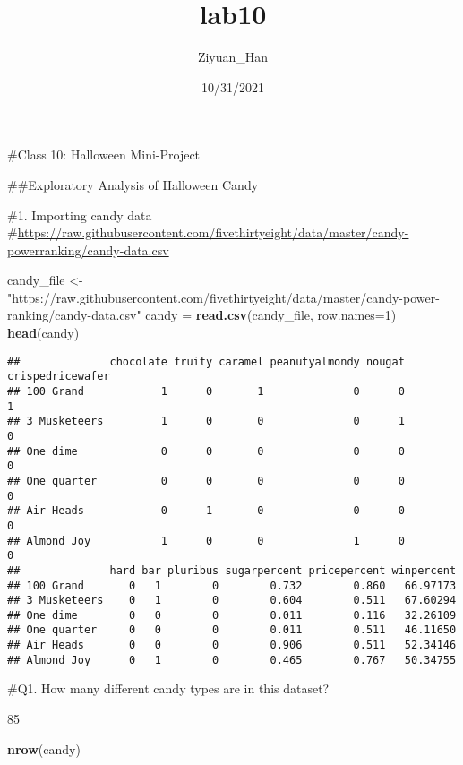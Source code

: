 \documentclass[
]{article}
\title{lab10}
\author{Ziyuan\_Han}
\date{10/31/2021}
\newenvironment{Shaded}{\begin{snugshade}}{\end{snugshade}}
\newcommand{\DataTypeTok}[1]{\textcolor[rgb]{0.13,0.29,0.53}{#1}}
\newcommand{\DecValTok}[1]{\textcolor[rgb]{0.00,0.00,0.81}{#1}}
\newcommand{\KeywordTok}[1]{\textcolor[rgb]{0.13,0.29,0.53}{\textbf{#1}}}
\newcommand{\NormalTok}[1]{#1}
\newcommand{\StringTok}[1]{\textcolor[rgb]{0.31,0.60,0.02}{#1}}
\begin{document}
\maketitle

\#Class 10: Halloween Mini-Project

\#\#Exploratory Analysis of Halloween Candy

\#1. Importing candy data
\#\url{https://raw.githubusercontent.com/fivethirtyeight/data/master/candy-powerranking/candy-data.csv}

\begin{Shaded}
\begin{Highlighting}[]
\NormalTok{candy_file <-}\StringTok{ "https://raw.githubusercontent.com/fivethirtyeight/data/master/candy-power-ranking/candy-data.csv"}
\NormalTok{candy =}\StringTok{ }\KeywordTok{read.csv}\NormalTok{(candy_file, }\DataTypeTok{row.names=}\DecValTok{1}\NormalTok{) }
\KeywordTok{head}\NormalTok{(candy)}
\end{Highlighting}
\end{Shaded}

\begin{verbatim}
##              chocolate fruity caramel peanutyalmondy nougat crispedricewafer
## 100 Grand            1      0       1              0      0                1
## 3 Musketeers         1      0       0              0      1                0
## One dime             0      0       0              0      0                0
## One quarter          0      0       0              0      0                0
## Air Heads            0      1       0              0      0                0
## Almond Joy           1      0       0              1      0                0
##              hard bar pluribus sugarpercent pricepercent winpercent
## 100 Grand       0   1        0        0.732        0.860   66.97173
## 3 Musketeers    0   1        0        0.604        0.511   67.60294
## One dime        0   0        0        0.011        0.116   32.26109
## One quarter     0   0        0        0.011        0.511   46.11650
## Air Heads       0   0        0        0.906        0.511   52.34146
## Almond Joy      0   1        0        0.465        0.767   50.34755
\end{verbatim}

\#Q1. How many different candy types are in this dataset?

85

\begin{Shaded}
\begin{Highlighting}[]
\KeywordTok{nrow}\NormalTok{(candy)}
\end{Highlighting}
\end{Shaded}
\end{document}

